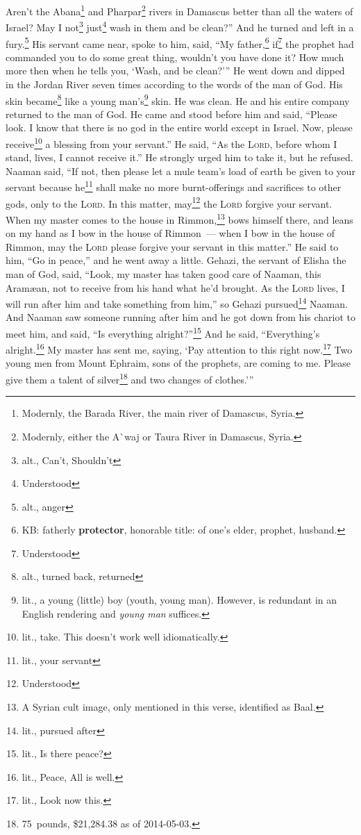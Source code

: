 \begin{inparaenum}
     Aren't the Abana\footnote{Modernly, the Barada River, the main river of Damascus, Syria.} and Pharpar\footnote{Modernly, either the A\`{}waj or Taura River in Damascus, Syria.} rivers in Damascus better than all the waters of Israel? May I not\footnote{alt., Can't, Shouldn't} just\footnote{Understood} wash in them and be clean?'' And he turned and left in a fury.\footnote{alt., anger}%
     His servant came near, spoke to him, said, ``My father,\footnote{KB: fatherly \textbf{protector}, honorable title: of one's elder, prophet, husband.} if\footnote{Understood} the prophet had commanded you to do some great thing, wouldn't you have done it? How much more then when he tells you, `Wash, and be clean?'\thinspace''%
     He went down and dipped in the Jordan River seven times according to the words of the man of God. His skin became\footnote{alt., turned back, returned} like a young man's\footnote{lit., a young (little) boy (youth, young man). However,  is redundant in an English rendering and \textit{young man} suffices.} skin. He was clean.%
     He and his entire company returned to the man of God. He came and stood before him and said, ``Please look. I know that there is no god in the entire world except in Israel. Now, please receive\footnote{lit., take. This doesn't work well idiomatically.} a blessing from your servant.''%
     He said, ``As the \textsc{Lord}, before whom I stand, lives, I cannot receive it.'' He strongly urged him to take it, but he refused.%
     Naaman said, ``If not, then please let a mule team's load of earth be given to your servant because he\footnote{lit., your servant} shall make no more burnt-offerings and sacrifices to other gods, only to the \textsc{Lord}.%
     In this matter, may\footnote{Understood} the \textsc{Lord} forgive your servant. When my master comes to the house in Rimmon,\footnote{A Syrian cult image, only mentioned in this verse, identified as Baal.} bows himself there, and leans on my hand as I bow in the house of Rimmon~--- when I bow in the house of Rimmon, may the \textsc{Lord} please forgive your servant in this matter.''%
     He said to him, ``Go in peace,'' and he went away a little.%
     Gehazi, the servant of Elisha the man of God, said, ``Look, my master has taken good care of Naaman, this Aram\ae{}an, not to receive from his hand what he'd brought. As the \textsc{Lord} lives, I will run after him and take something from him,''%
     so Gehazi pursued\footnote{lit., pursued after} Naaman. And Naaman saw someone running after him and he got down from his chariot to meet him, and said, ``Is everything alright?''\footnote{lit., Is there peace?}%
     And he said, ``Everything's alright.\footnote{lit., Peace, All is well.} My master has sent me, saying, `Pay attention to this right now.\footnote{lit., Look now this.} Two young men from Mount Ephraim, sons of the prophets, are coming to me. Please give them a talent of silver\footnote{75~pounds, \$21,284.38 as of 2014-05-03.} and two changes of clothes.'\thinspace''%
\end{inparaenum}
